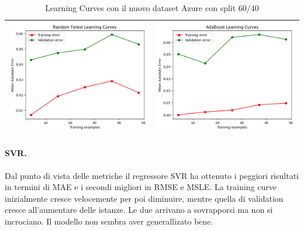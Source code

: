 \begin{table}[H]
\begin{tabularx}{\textwidth}{|X|X|}
        \includegraphics[width=\linewidth, trim=0 0 0 0]{images/RandomForest_lc60_Azure.png} &
        \includegraphics[width=\linewidth, trim=0 0 0 0]{images/AdaBoost_lc60_Azure.png} \\
        \hline
    \end{tabularx}
    \caption{Learning Curves con il nuovo dataset Azure con split 60/40}
    \label{tab:emissions_info}
\end{table}

\paragraph{\textbf{SVR}.}
Dal punto di vista delle metriche il regressore SVR ha ottenuto i peggiori risultati in termini di MAE e i secondi migliori in RMSE e MSLE. La training curve inizialmente cresce velocemente per poi diminuire, mentre quella di validation cresce all'aumentare delle istanze. Le due arrivano a sovrapporsi ma non si incrociano. Il modello non sembra aver generallizato bene.

